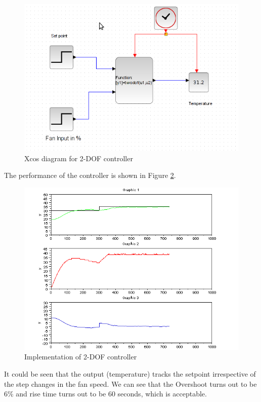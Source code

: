 \begin{figure}
\centering
\includegraphics[width=\linewidth]{2-DOF_manual/2dof-xcos}
\caption{Xcos diagram for 2-DOF controller}
\label{2dof-xcos}
\end{figure}
The performance of the controller is shown in Figure \ref{rt_127}. 
\begin{figure}
\centering
\includegraphics[width=\linewidth]{2-DOF_manual/2dof_resp.png}
\caption{Implementation of 2-DOF controller}
\label{rt_127}
\end{figure}
It could be seen that the output (temperature) tracks the setpoint irrespective of the step changes in the fan speed.
We can see that the Overshoot turns out to be 6\% and rise time turns out to be 60 seconds, which is acceptable.

